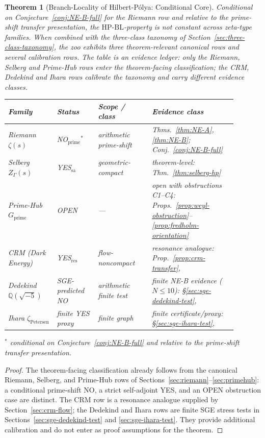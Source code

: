 \documentclass[11pt]{article}
\newtheorem{theorem}{Theorem}[section]
\theoremstyle{definition}
\theoremstyle{remark}
\newcommand{\HBL}{\mathrm{HP\text{-}BL}}
\begin{document}
\begin{theorem}[Branch-Locality of Hilbert-P\'olya: Conditional Core]\label{thm:boundary}
Conditional on Conjecture~\ref{conj:NE-B-full} for the Riemann row and
relative to the prime-shift transfer presentation, the $\HBL$-property
is not constant across zeta-type families. When combined with the
three-class taxonomy of Section~\ref{sec:three-class-taxonomy}, the zoo
exhibits three theorem-relevant canonical rows and several calibration
rows. The table is an evidence ledger: only the Riemann, Selberg and
Prime-Hub rows enter the theorem-facing classification; the CRM,
Dedekind and Ihara rows calibrate the taxonomy and carry different
evidence classes.

\begin{center}
\renewcommand{\arraystretch}{1.15}
\begin{tabular}{@{}p{0.19\linewidth}p{0.16\linewidth}p{0.21\linewidth}p{0.33\linewidth}@{}}
\toprule
Family & Status & Scope / class & Evidence class \\
\midrule
Riemann $\zeta(s)$ & NO${}_{\mathrm{prime}}{}^*$ & arithmetic prime-shift &
  Thms.~\ref{thm:NE-A}, \ref{thm:NE-B}; Conj.~\ref{conj:NE-B-full} \\
Selberg $Z_\Gamma(s)$ & YES$_{\mathrm{sa}}$ & geometric-compact & theorem-level: Thm.~\ref{thm:selberg-hp} \\
Prime-Hub $G_\mathrm{prime}$ & OPEN & --- &
  open with obstructions C1--C4: Props.~\ref{prop:weyl-obstruction}--\ref{prop:fredholm-orientation} \\
CRM (Dark Energy) & YES$_{\mathrm{res}}$ & flow-noncompact & resonance analogue: Prop.~\ref{prop:crm-transfer}, \cite{DyatlovZworski2019} \\
Dedekind $\mathbb{Q}(\sqrt{-5})$ & SGE-predicted NO & arithmetic finite test & finite NE-B evidence ($N\leq 10$): \S\ref{sec:sge-dedekind-test}, \cite{DedekindNEBTest} \\
Ihara $\zeta_{\text{Petersen}}$ & finite YES proxy & finite graph & finite certificate/proxy: \S\ref{sec:sge-ihara-test}, \cite{IharaPetersenTest} \\
\bottomrule
\end{tabular}
\end{center}
${}^*$ conditional on Conjecture~\ref{conj:NE-B-full} and relative to
the prime-shift transfer presentation.
\end{theorem}

\begin{proof}
The theorem-facing classification already follows from the canonical
Riemann, Selberg, and Prime-Hub rows of
Sections~\ref{sec:riemann}--\ref{sec:primehub}: a conditional
prime-shift NO, a strict self-adjoint YES, and an OPEN obstruction
case are distinct. The CRM row is a resonance analogue supplied by
Section~\ref{sec:crm-flow}; the Dedekind and Ihara rows are finite
SGE stress tests in Sections~\ref{sec:sge-dedekind-test} and
\ref{sec:sge-ihara-test}. They provide additional calibration and
do not enter as proof assumptions for the theorem.
\end{proof}
\end{document}
